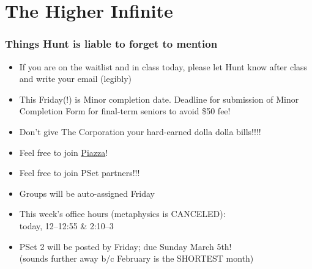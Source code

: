 \section{The Higher Infinite}

\begin{frame}

\scriptsize{\tableofcontents}

\end{frame}


\begin{frame}
\frametitle{Things Hunt is liable to forget to mention}

\begin{itemize}[<+->]


\item If you are on the waitlist and in class today, please let Hunt know after class and write your email (legibly) 

\item This Friday(!) is Minor completion date. Deadline for submission of Minor Completion Form for final-term seniors to avoid \$50 fee! 
\item[] Don't give The Corporation your hard-earned dolla dolla bills!!!! 

\item Feel free to join \href{https://piazza.com/mit/spring2023/24118}{Piazza}! 

\item Feel free to join PSet partners!!! 
\item[] Groups will be auto-assigned Friday


\item This week's office hours (metaphysics is CANCELED): \\ today, 12--12:55 \& 2:10--3

\item PSet 2 will be posted by Friday; due Sunday March 5th! \\ (sounds further away b/c February is the SHORTEST month)



\end{itemize}
\end{frame}


